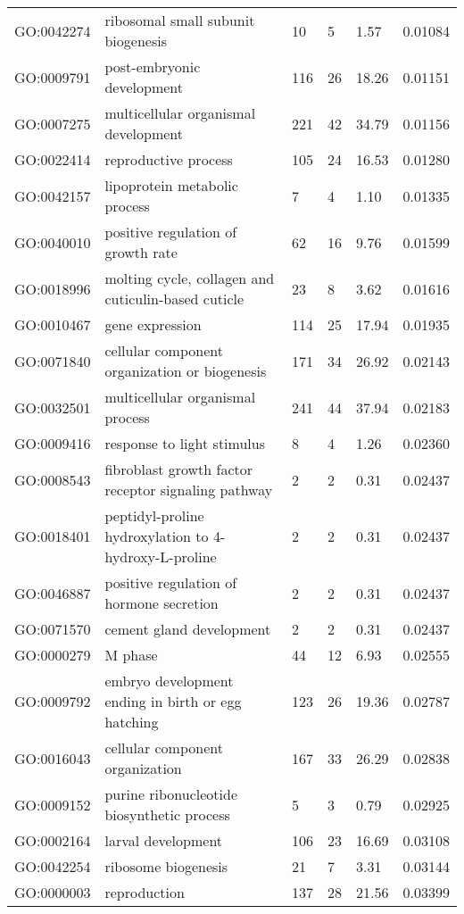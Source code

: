 \documentclass[10pt]{bmc_article}
\newenvironment{bmcformat}{\begin{raggedright}\baselineskip20pt\sloppy\setboolean{publ}{false}}{\end{raggedright}\baselineskip20pt\sloppy}
\begin{document}
\begin{bmcformat}
\begin{longtable}{lp{4.5cm}llll}
  GO:0042274 & ribosomal small subunit biogenesis &  10 &   5 & 1.57 & 0.01084 \\ 
  GO:0009791 & post-embryonic development & 116 &  26 & 18.26 & 0.01151 \\ 
  GO:0007275 & multicellular organismal development & 221 &  42 & 34.79 & 0.01156 \\ 
  GO:0022414 & reproductive process & 105 &  24 & 16.53 & 0.01280 \\ 
  GO:0042157 & lipoprotein metabolic process &   7 &   4 & 1.10 & 0.01335 \\ 
  GO:0040010 & positive regulation of growth rate &  62 &  16 & 9.76 & 0.01599 \\ 
  GO:0018996 & molting cycle, collagen and cuticulin-based cuticle &  23 &   8 & 3.62 & 0.01616 \\ 
  GO:0010467 & gene expression & 114 &  25 & 17.94 & 0.01935 \\ 
  GO:0071840 & cellular component organization or biogenesis & 171 &  34 & 26.92 & 0.02143 \\ 
  GO:0032501 & multicellular organismal process & 241 &  44 & 37.94 & 0.02183 \\ 
  GO:0009416 & response to light stimulus &   8 &   4 & 1.26 & 0.02360 \\ 
  GO:0008543 & fibroblast growth factor receptor signaling pathway &   2 &   2 & 0.31 & 0.02437 \\ 
  GO:0018401 & peptidyl-proline hydroxylation to 4-hydroxy-L-proline &   2 &   2 & 0.31 & 0.02437 \\ 
  GO:0046887 & positive regulation of hormone secretion &   2 &   2 & 0.31 & 0.02437 \\ 
  GO:0071570 & cement gland development &   2 &   2 & 0.31 & 0.02437 \\ 
  GO:0000279 & M phase &  44 &  12 & 6.93 & 0.02555 \\ 
  GO:0009792 & embryo development ending in birth or egg hatching & 123 &  26 & 19.36 & 0.02787 \\ 
  GO:0016043 & cellular component organization & 167 &  33 & 26.29 & 0.02838 \\ 
  GO:0009152 & purine ribonucleotide biosynthetic process &   5 &   3 & 0.79 & 0.02925 \\ 
  GO:0002164 & larval development & 106 &  23 & 16.69 & 0.03108 \\ 
  GO:0042254 & ribosome biogenesis &  21 &   7 & 3.31 & 0.03144 \\ 
  GO:0000003 & reproduction & 137 &  28 & 21.56 & 0.03399 \\ 

\end{longtable}
\end{bmcformat}
\end{document}
